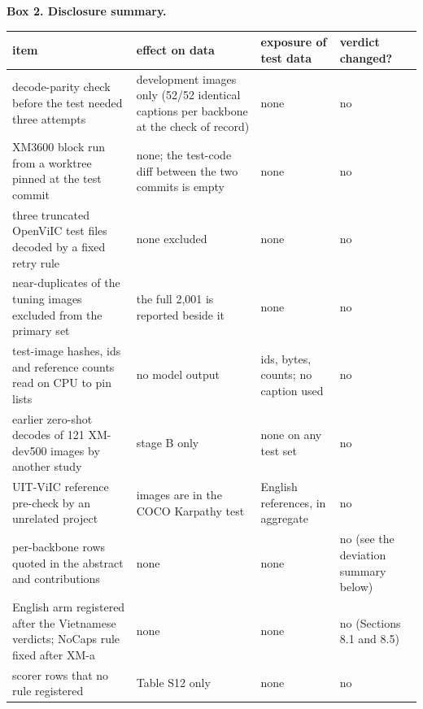 \textbf{Box 2. Disclosure summary.}

\begin{longtable}[]{@{}
  >{\raggedright\arraybackslash}p{}
  >{\raggedright\arraybackslash}p{}
  >{\raggedright\arraybackslash}p{}
  >{\raggedright\arraybackslash}p{}@{}}
\toprule\noalign{}
\begin{minipage}[b]{\linewidth}\raggedright
item
\end{minipage} & \begin{minipage}[b]{\linewidth}\raggedright
effect on data
\end{minipage} & \begin{minipage}[b]{\linewidth}\raggedright
exposure of test data
\end{minipage} & \begin{minipage}[b]{\linewidth}\raggedright
verdict changed?
\end{minipage} \\
\midrule\noalign{}
\endhead
\bottomrule\noalign{}
\endlastfoot
decode-parity check before the test needed three attempts & development images only (52/52 identical
captions per backbone at the check of record) & none & no \\
XM3600 block run from a worktree pinned at the test commit & none; the test-code diff between the
two commits is empty & none & no \\
three truncated OpenViIC test files decoded by a fixed retry rule & none excluded & none & no \\
60 near-duplicates of the tuning images excluded from the primary set & the full 2,001 is reported
beside it & none & no \\
test-image hashes, ids and reference counts read on CPU to pin lists & no model output & ids, bytes,
counts; no caption used & no \\
earlier zero-shot decodes of 121 XM-dev500 images by another study & stage B only & none on any test
set & no \\
UIT-ViIC reference pre-check by an unrelated project & 133 images are in the COCO Karpathy test &
English references, in aggregate & no \\
per-backbone rows quoted in the abstract and contributions & none & none & no (see the deviation
summary below) \\
English arm registered after the Vietnamese verdicts; NoCaps rule fixed after XM-a & none & none &
no (Sections 8.1 and 8.5) \\
scorer rows that no rule registered & Table S12 only & none & no \\
\end{longtable}

